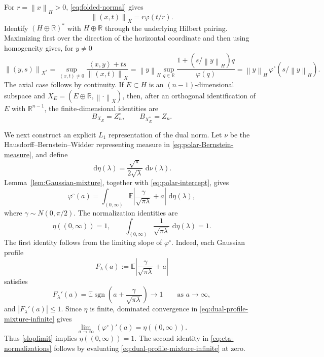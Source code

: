 \documentclass[11pt]{article}
\theoremstyle{definition}
\theoremstyle{remark}
\newcommand{\R}{\mathbb R}
\newcommand{\dd}{\,\mathrm d}
\newcommand{\E}{\mathbb E}
\newcommand{\abs}[1]{\left|#1\right|}
\newcommand{\norm}[1]{\left\|#1\right\|}
\newcommand{\ip}[2]{\left\langle #1,#2\right\rangle}
\begin{document}
For $r=\norm{x}_H>0$, \eqref{eq:folded-normal} gives
\begin{equation}\label{eq:X-profile}
 \norm{(x,t)}_X=r\varphi(t/r).
\end{equation}
Identify $(H\oplus\R)^*$ with $H\oplus\R$ through the underlying
Hilbert pairing.  Maximizing first over the direction of the horizontal
coordinate and then using homogeneity gives, for $y\ne0$
\begin{equation}\label{eq:X-dual-profile}
 \norm{(y,s)}_{X^*}
 =\sup_{(x,t)\neq0}
 \frac{\ip{x}{y}+ts}{\norm{(x,t)}_X}
 =\norm{y}_H\sup_{q\in\R}
 \frac{1+(s/\norm{y}_H)q}{\varphi(q)}
=\norm{y}_H\,\varphi^\circ(s/\norm{y}_H).
\end{equation}
The axial case follows by continuity.  If
$E\subset H$ is an $(n-1)$-dimensional subspace and
$X_E=(E\oplus\R,\norm{\cdot}_X)$, then, after an orthogonal
identification of $E$ with $\R^{n-1}$, the finite-dimensional
identities are
\[
 B_{X_E}=Z_n^\circ,
 \qquad B_{X_E^*}=Z_n.
\]

We next construct an explicit $L_1$ representation of the dual norm.
Let $\nu$ be the Hausdorff--Bernstein--Widder representing measure in
\eqref{eq:polar-Bernstein-measure}, and define
\begin{equation}\label{eq:eta-infinite}
 \dd\eta(\lambda)
 =\frac{\sqrt\pi}{2\sqrt\lambda}\,\dd\nu(\lambda).
\end{equation}
Lemma~\ref{lem:Gaussian-mixture}, together with
\eqref{eq:polar-intercept}, gives
\begin{equation}\label{eq:dual-profile-mixture-infinite}
 \varphi^\circ(a)
 =\int_{(0,\infty)}
 \E\abs{\frac{\gamma}{\sqrt{\pi\lambda}}+a}
 \,\dd\eta(\lambda),
\end{equation}
where $\gamma\sim N(0,\pi/2)$.  The normalization identities are
\begin{equation}\label{eq:eta-normalizations}
 \eta((0,\infty))=1,
 \qquad
 \int_{(0,\infty)}\frac1{\sqrt{\pi\lambda}}
 \,\dd\eta(\lambda)=1.
\end{equation}
The first identity follows from the limiting slope of
$\varphi^\circ$. Indeed, each Gaussian profile
\[
 F_\lambda(a):=
 \E\abs{\frac{\gamma}{\sqrt{\pi\lambda}}+a}
\]
satisfies
\[
 F_\lambda'(a)
 =\E\operatorname{sgn}\left(
 a+\frac{\gamma}{\sqrt{\pi\lambda}}\right)
 \longrightarrow 1
 \qquad \mbox{as } a\to\infty,
\]
and $\abs{F_\lambda'(a)}\leq1$.  Since $\eta$ is finite,
dominated convergence in
\eqref{eq:dual-profile-mixture-infinite} gives
\[
 \lim_{a\to\infty}(\varphi^\circ)'(a)
 =\eta((0,\infty)).
\]
Thus \eqref{sloplimit}  implies
$\eta((0,\infty))=1$. The second identity in  \eqref{eq:eta-normalizations}  follows by evaluating
\eqref{eq:dual-profile-mixture-infinite} at zero.  
\end{document}

